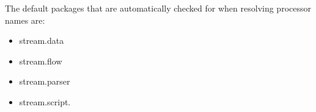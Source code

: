 The default packages that are automatically checked for when resolving processor names are:
\begin{itemize}
  \item {\ttfamily stream.data}
  \item {\ttfamily stream.flow}
  \item {\ttfamily stream.parser}
  \item {\ttfamily stream.script}.
\end{itemize}








